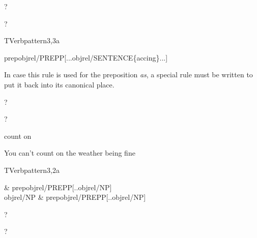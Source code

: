 
\begin{thetadescr}
\evitem ?
\esitem
     \begin{examples}
        \example ?
     \end{examples}
\end{thetadescr}


\newpage
\verbpattern{[synPREPCLOSEDGERUND] }
\begin{vpattern}
 TVerbpattern3,3a
\csritem \mbox{}\\
     \begin{csr}
       prepobjrel/PREPP[...objrel/SENTENCE\{accing\}...]
     \end{csr}
\remarksitem In case this rule is used for the preposition {\em as\/}, a special 
rule must be written to put it back into its canonical place.
\end{vpattern}


\begin{thetadescr}
\evitem ?
\esitem
     \begin{examples}
        \example ?
     \end{examples}
\end{thetadescr}



\begin{thetadescr}
\evitem count on
\esitem
     \begin{examples}
        \example You can't count on the weather being fine
     \end{examples}
\end{thetadescr}


\newpage
\verbpattern{[synPREPCLOSEDNPPROP]}
\begin{vpattern}
 TVerbpattern3,2a
\csritem \mbox{}\\
     \begin{csr}
                & prepobjrel/PREPP[..objrel/NP]\\
      objrel/NP & prepobjrel/PREPP[..objrel/NP]
     \end{csr}
\remarksitem
\end{vpattern}


\begin{thetadescr}
\evitem ?
\esitem
     \begin{examples}
        \example ?
     \end{examples}
\end{thetadescr}


